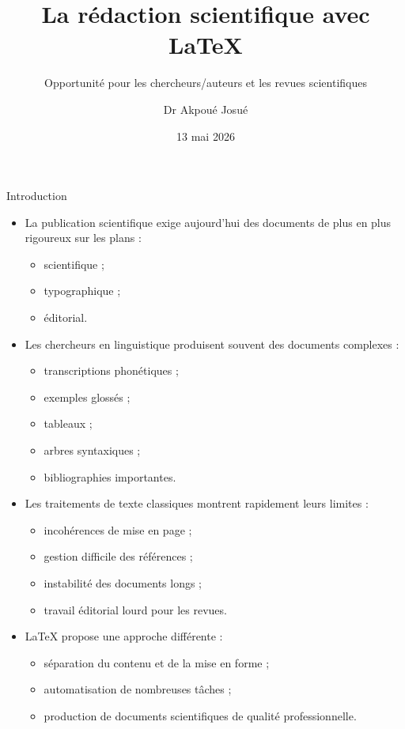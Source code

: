 \documentclass[aspectratio=169]{beamer}
\title{La rédaction scientifique avec \LaTeX}
\subtitle{Opportunité pour les chercheurs/auteurs et les revues scientifiques}
\author{Dr Akpoué Josué}
\date{13 mai 2026}
\begin{document}
	
	\begin{frame}
		\titlepage
	\end{frame}
	
	\begin{frame}{Introduction}
		\begin{itemize}
			\item La publication scientifique exige aujourd’hui des documents de plus en plus rigoureux sur les plans :
			\begin{itemize}
				\item scientifique ;
				\item typographique ;
				\item éditorial.
			\end{itemize}
			
			\vspace{0.3cm}
			
			\item Les chercheurs en linguistique produisent souvent des documents complexes :
			\begin{itemize}
				\item transcriptions phonétiques ;
				\item exemples glossés ;
				\item tableaux ;
				\item arbres syntaxiques ;
				\item bibliographies importantes.
			\end{itemize}
			
			\vspace{0.3cm}
			
			\item Les traitements de texte classiques montrent rapidement leurs limites :
			\begin{itemize}
				\item incohérences de mise en page ;
				\item gestion difficile des références ;
				\item instabilité des documents longs ;
				\item travail éditorial lourd pour les revues.
			\end{itemize}
			
			\vspace{0.3cm}
			
			\item \LaTeX{} propose une approche différente :
			\begin{itemize}
				\item séparation du contenu et de la mise en forme ;
				\item automatisation de nombreuses tâches ;
				\item production de documents scientifiques de qualité professionnelle.
			\end{itemize}
		\end{itemize}
	\end{frame}
	
\end{document}
